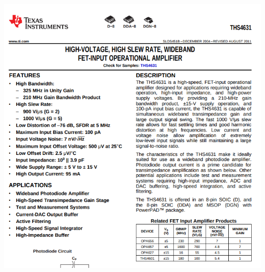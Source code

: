 \documentclass{beamer}
\begin{document}
\begin{frame}
  \includegraphics[width=\textwidth]{figs/ths4631-data.png}

\end{frame}
\end{document}
